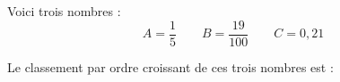 
Voici trois nombres :
\[A = \frac{1}{5} \qquad B = \frac{19}{100} \qquad C = 0{,}21\]

Le classement par ordre croissant de ces trois nombres est :

\smallskip


